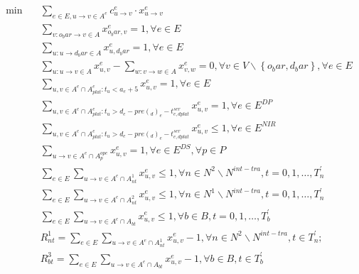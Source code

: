 \begin{align}
  \min\quad & \sum_{e \in E, u \rightarrow v \in A^{e}} c_{u \rightarrow v}^{e} \cdot x_{u \rightarrow v}^{e} \tag{eq\_0001} \\
  & \sum_{v : o_bar \rightarrow v \in A} x_{o_bar , v}^{e} = 1 , \forall e \in E \tag{eq\_0002} \\
  & \sum_{u : u \rightarrow d_bar \in A} x_{u , d_bar}^{e} = 1 , \forall e \in E \tag{eq\_0003} \\
  & \sum_{u : u \rightarrow v \in A} x_{u , v}^{e} - \sum_{w : v \rightarrow w \in A} x_{v , w}^{e} = 0 , \forall v \in V \backslash \left\{o_bar , d_bar\right\} , \forall e \in E \tag{eq\_0004} \\
  & \sum_{u , v \in A^{e} \cap A_{p l a t}^{e} : t_{u} < a_{e} + 5} x_{u , v}^{e} = 1 , \forall e \in E \tag{eq\_0005} \\
  & \sum_{u , v \in A^{e} \cap A_{p l a t}^{e} : t_{u} > d_{e} - p r e \left(_ d\right)_{e} - t_{e , d p l a t}^{s e r}} x_{u , v}^{e} = 1 , \forall e \in E^{D P} \tag{eq\_0006} \\
  & \sum_{u , v \in A^{e} \cap A_{p l a t}^{e} : t_{u} > d_{e} - p r e \left(_ d\right)_{e} - t_{e , d p l a t}^{s e r}} x_{u , v}^{e} \leq 1 , \forall e \in E^{N I R} \tag{eq\_0007} \\
  & \sum_{u \rightarrow v \in A^{e} \cap A_{p}^{o p e}} x_{u , v}^{e} = 1 , \forall e \in E^{D S} , \forall p \in P \tag{eq\_0008} \\
  & \sum_{e \in E} \underset{u \rightarrow v \in A^{e} \cap A_{\mathit{nt}}^{1}}{\sum} x_{u , v}^{e} \leq 1 , \forall n \in N^{2} \backslash N^{i n t - t r a} , t = 0 , 1 , \hdots , T_{n}^{'} \tag{eq\_0009} \\
  & \sum_{e \in E} \underset{u \rightarrow v \in A^{e} \cap A_{\mathit{nt}}^{2}}{\sum} x_{u , v}^{e} \leq 1 , \forall n \in N^{1} \backslash N^{i n t - t r a} , t = 0 , 1 , \hdots , T_{n}^{'} \tag{eq\_0010} \\
  & \sum_{e \in E} \underset{u \rightarrow v \in A^{e} \cap A_{\mathit{bt}}}{\sum} x_{u , v}^{e} \leq 1 , \forall b \in B , t = 0 , 1 , \hdots , T_{b}^{'} \tag{eq\_0011} \\
  & R_{\mathit{nt}}^{1} = \sum_{e \in E} \underset{u \rightarrow v \in A^{e} \cap A_{\mathit{nt}}^{1}}{\sum} x_{u , v}^{e} - 1 , \forall n \in N^{2} \backslash N^{i n t - t r a} , t \in T_{n}^{'} ; \tag{eq\_0014} \\
  & R_{\mathit{bt}}^{3} = \sum_{e \in E} \underset{u \rightarrow v \in A^{e} \cap A_{\mathit{bt}}}{\sum} x_{u , v}^{e} - 1 , \forall b \in B , t \in T_{b}^{'} \tag{eq\_0015} \\

\end{align}
